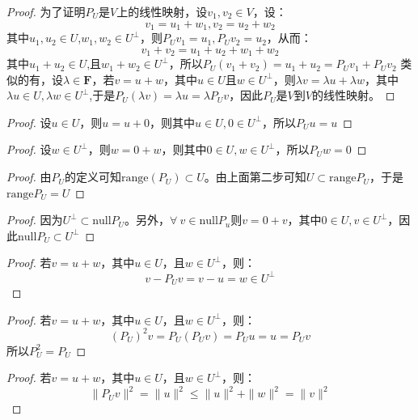 \documentclass[10pt,a4paper,UTF8]{article}
\begin{document}
\begin{proof}
为了证明\(P_{U}\)是\(V\)上的线性映射，设\(v_{1},v_{2}\in V\)，设：
\begin{equation}
\label{eq:6}
v_{1} = u_{1} + w_{1}, v_{2} = u_{2} + w_{2}
\end{equation}
其中\(u_{1},u_{2}\in U\),\(w_{1},w_{2}\in U^{\perp}\)，则\(P_{U}v_{1} = u_{1},P_{U}v_{2} = u_{2}\)，从而：
\[v_{1} + v_{2} = u_{1} + u_{2} + w_{1} + w_{2}\]
其中\(u_{1} + u_{2}\in U\),且\(w_{1} + w_{2}\in U^{\perp}\)，所以\(P_{U}(v_{1}+ v_{2}) = u_{1} + u_{2} = P_{U}v_{1} + P_{U}v_{2}\)
类似的有，设\(\lambda\in \mathbf{F}\)，若\(v= u + w\)，其中\(u\in U\)且\(w\in U^{\perp}\)，则\(\lambda v = \lambda u + \lambda w\)，其中\(\lambda u\in U, \lambda w\in U^{\perp}\),于是\(P_{U}(\lambda v) = \lambda u = \lambda P_{U}v\)，因此\(P_{U}\)是\(V\)到\(V\)的线性映射。
\end{proof}
\begin{proof}
设\(u\in U\)，则\(u = u + 0\)，则其中\(u\in U,0\in U^{\perp}\)，所以\(P_{U}u = u\)
\end{proof}
\begin{proof}
设\(w\in U^{\perp}\)，则\(w = 0 + w\)，则其中\(0\in U,w\in U^{\perp}\)，所以\(P_{U}w = 0\)
\end{proof}
\begin{proof}
由\(P_{U}\)的定义可知\(\mathrm{range}(P_{U})\subset U\)。由上面第二步可知\(U\subset \mathrm{range}P_{U}\)，于是\(\mathrm{range}P_{U} = U\)
\end{proof}

\begin{proof}
因为\(U^{\perp}\subset \mathrm{null}P_{U}\)。另外，\(\forall~v\in \mathrm{null}P_{u}\)则\(v= 0+ v\)，其中\(0\in U,v\in U^{\perp}\)，因此\(\mathrm{null}P_{U}\subset U^{\perp}\)
\end{proof}

\begin{proof}
若\(v = u + w\)，其中\(u\in U\)，且\(w\in U^{\perp}\)，则：
\[v- P_{U}v= v-u = w\in U^{\perp} \]
\end{proof}

\begin{proof}
若\(v = u+w\)，其中\(u\in U\)，且\(w\in U^{\perp}\)，则：
\begin{equation}
\label{eq:7}
(P_{U})^{2}v = P_{U}(P_{U}v) = P_{U}u= u= P_{U}v
\end{equation}
所以\(P_{U}^{2} = P_{U}\)
\end{proof}

\begin{proof}
若\(v = u+w\)，其中\(u\in U\)，且\(w\in U^{\perp}\)，则：
\[ \| P_{U}v \|^{2} = \| u \|^{2} \leq \| u \|^{2} + \| w \|^{2} = \| v \|^{2}  \]
\end{proof}
\end{document}
